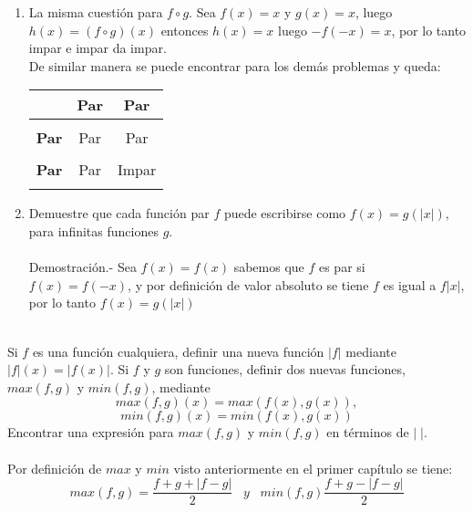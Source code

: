 \begin{ej}
\begin{enumerate}[\bfseries a)]
\begin{center}
\begin{tabular}{c|cc}
\end{tabular}
\end{center}
\item La misma cuestión para $f \circ g.$
Sea $f(x)=x$ \; y \; $g(x)=x$, luego $h(x)=(f \circ g)(x)$ entonces $h(x) = x$ luego $-f(-x) = x$, por lo tanto impar e impar da impar.\\
De similar manera se puede encontrar para los demás problemas y queda:
\begin{center}
\begin{tabular}{c|cc}
&\textbf{Par}&\textbf{Par}\\
\hline\\
\textbf{Par}&Par&Par\\\\
\textbf{Par}&Par&Impar\\\\
\end{tabular}
\end{center}
\item Demuestre que cada función par $f$ puede escribirse como $f(x)=g(|x|),$ para infinitas funciones $g$.\\\\ 
Demostración.- \; Sea $f(x)=f(x)$ sabemos que $f$ es par si $f(x)=f(-x)$, y por definición de valor absoluto se tiene $f$ es igual a $f|x|$, por lo tanto $f(x)=g(|x|)$\\\\
\end{enumerate}
\end{ej}

\begin{ej}
Si $f$ es una función cualquiera, definir una nueva función $|f|$ mediante $|f|(x)=|f(x)|$. Si $f$ \; y \; $g$ son funciones, definir dos nuevas funciones, $max(f,g)$ y $min(f,g)$, mediante $$max(f,g)(x)=max(f(x),g(x)),$$ $$min(f,g)(x)=min(f(x),g(x))$$
Encontrar una expresión para $max(f,g)$ y $min(f,g)$ en términos de $|\; |$.\\\\
Por definición de $max$ y $min$ visto anteriormente en el primer capítulo se tiene: $$max(f,g) = \dfrac{f+g + |f-g|}{2} \; \; \; y \; \; \; min(f,g) \dfrac{f+g - |f-g|}{2}$$ 
\end{ej} 

